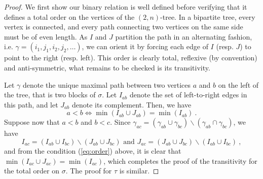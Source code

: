 \documentclass{amsart}
\theoremstyle{definition}
\newcommand{\ssm}{\smallsetminus} %
\begin{document}
\begin{proof}
We first show our binary relation is well defined before verifying that it defines a total order on the vertices of the $(2,n)$-tree.
In a bipartite tree, every vertex is connected, and every path connecting two vertices on the same side must be of even length. 
As $I$ and $J$ partition the path in an alternating fashion, i.e. $\gamma=(i_1,j_1,i_2,j_2,\dots)$, we can orient it by forcing each edge of $I$ (resp. $J$) to point to the right (resp. left). 
This order is clearly total, reflexive (by convention) and anti-symmetric, what remains to be checked is its transitivity. 

Let $\gamma$ denote the unique maximal path between two vertices $a$ and $b$ on the left of the tree, that is two blocks of $\sigma$. 
Let $I_{ab}$ denote the set of left-to-right edges in this path, and let $J_{ab}$ denote its complement. 
Then, we have 
\begin{equation}
    \label{eq:order}
    a < b \iff \min(I_{ab}\cup J_{ab})=\min(I_{ab}) \ . 
\end{equation}
Suppose now that $a < b$ and $b < c$.
Since $\gamma_{ac}= (\gamma_{ab} \cup \gamma_{bc}) \ssm (\gamma_{ab} \cap \gamma_{bc})$, we have $$ I_{ac}=(I_{ab}\cup I_{bc}) \ssm (J_{ab} \cup J_{bc}) \text{ and } J_{ac}=(J_{ab}\cup J_{bc}) \ssm (I_{ab} \cup I_{bc}) \ , $$ and from the condition (\ref{eq:order}) above, it is clear that $\min(I_{ac}\cup J_{ac})=\min(I_{ac})$, which completes the proof of the transitivity for the total order on $\sigma$. 
The proof for $\tau$ is similar. 
\end{proof}
\end{document}
